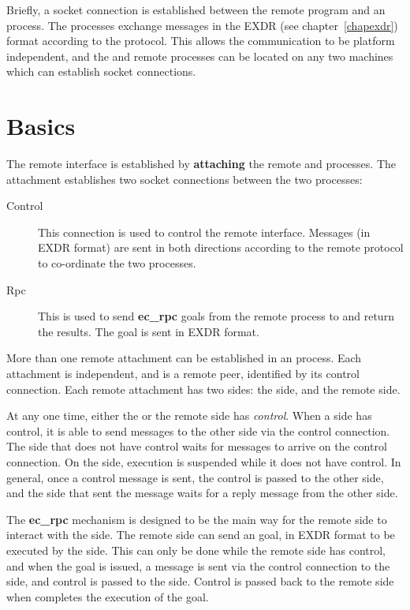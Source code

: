 Briefly, a socket connection is established between the remote program and
an {\eclipse} process. The processes exchange messages in the EXDR (see
chapter~\ref{chapexdr}) format according to the protocol. This allows the
communication to be platform independent, and the {\eclipse} and remote
processes can be located on any two machines which can establish socket
connections. 

\section{Basics}
\label{remoteprotobasic}

The remote interface is established by {\bf attaching} the remote and
{\eclipse} processes. The attachment establishes two socket connections
between the two processes:

\begin{description}
\item[Control] This connection is used to control the remote
interface. Messages (in EXDR format) are sent in both directions according
to the remote protocol to co-ordinate the two processes.
\item[Rpc] This is used to send {\bf ec_rpc} goals from the remote process
to {\eclipse} and return the results. The goal is sent in EXDR format.
\end{description}

More than one remote attachment can be established in an {\eclipse}
process. Each attachment is independent, and is a remote peer,
identified by its control
connection. Each remote attachment has two sides: the {\eclipse} side, and
the remote side. 

At any one time, either the {\eclipse} or the remote side has {\it
control}. When a side has control, it is able to send messages to the other
side via the control connection. The side that does not have control
waits for messages to arrive on the control connection. On the {\eclipse}
side, execution is suspended while it does not have control. In general, once a
control message is sent, the control is passed to the other side, and the
side that sent the message waits for a reply message from the other side.

The {\bf ec_rpc} mechanism is designed to be the main way for the remote
side to interact with the {\eclipse} side. The remote side can send an
{\eclipse} goal, in EXDR format to be executed by the {\eclipse} side. This
can only be done while the remote side has control, and when the goal is
issued, a message is sent via the control connection to the {\eclipse}
side, and control is passed to the {\eclipse} side. Control is passed back
to the remote side when {\eclipse} completes the execution of the goal.

